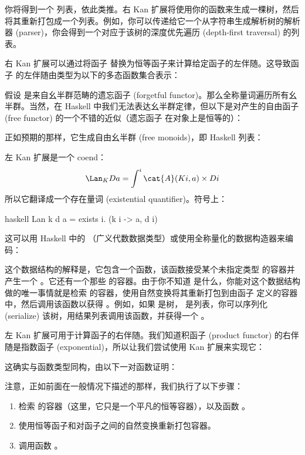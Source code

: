 你将得到一个  列表，依此类推。右 Kan 扩展将使用你的函数来生成一棵树，然后将其重新打包成一个列表。例如，你可以传递给它一个从字符串生成解析树的解析器 (parser)，你会得到一个对应于该树的深度优先遍历 (depth-first traversal) 的列表。

右 Kan 扩展可以通过将函子  替换为恒等函子来计算给定函子的左伴随。这导致函子  的左伴随由类型为以下的多态函数集合表示：

假设  是来自幺半群范畴的遗忘函子 (forgetful functor)。那么全称量词遍历所有幺半群。当然，在 Haskell 中我们无法表达幺半群定律，但以下是对产生的自由函子 (free functor) 的一个不错的近似（遗忘函子  在对象上是恒等的）：

正如预期的那样，它生成自由幺半群 (free monoids)，即 Haskell 列表：

左 Kan 扩展是一个 coend：
\[\Lan_{K}D a = \int^i \cat{A}(K i, a)\times{}D i\]
所以它翻译成一个存在量词 (existential quantifier)。符号上：

\begin{snip}{haskell}
Lan k d a = exists i. (k i -> a, d i)
\end{snip}
这可以用 Haskell 中的 （广义代数数据类型）或使用全称量化的数据构造器来编码：

这个数据结构的解释是，它包含一个函数，该函数接受某个未指定类型  的容器并产生一个 。它还有一个那些  的容器。由于你不知道  是什么，你能对这个数据结构做的唯一事情就是检索  的容器，使用自然变换将其重新打包到由函子  定义的容器中，然后调用该函数以获得 。例如，如果  是树， 是列表，你可以序列化 (serialize) 该树，用结果列表调用该函数，并获得一个 。

左 Kan 扩展可用于计算函子的右伴随。我们知道积函子 (product functor) 的右伴随是指数函子 (exponential)，所以让我们尝试使用 Kan 扩展来实现它：

这确实与函数类型同构，由以下一对函数证明：

注意，正如前面在一般情况下描述的那样，我们执行了以下步骤：

\begin{enumerate}
  \tightlist
  \item
        检索  的容器（这里，它只是一个平凡的恒等容器），以及函数 。
  \item
        使用恒等函子和对函子之间的自然变换重新打包容器。
  \item
        调用函数 。
\end{enumerate}

